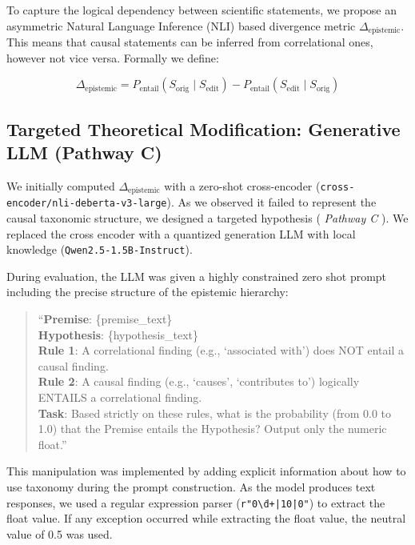 \documentclass[acmsmall]{acmart}
\begin{document}
To capture the logical dependency between scientific statements, we propose an asymmetric Natural Language Inference (NLI) based divergence metric $\Delta_{\text{epistemic}}$. This means that causal statements can be inferred from correlational ones, however not vice versa. Formally we define:

\begin{equation}
\Delta_{\text{epistemic}} = P_{\text{entail}}(S_{\text{orig}} \mid S_{\text{edit}}) - P_{\text{entail}}(S_{\text{edit}} \mid S_{\text{orig}})
\end{equation}

\subsection{Targeted Theoretical Modification: Generative LLM (Pathway C)}

We initially computed $\Delta_{\text{epistemic}}$ with a zero-shot cross-encoder (\texttt{cross-encoder/nli-deberta-v3-large}). As we observed it failed to represent the causal taxonomic structure, we designed a targeted hypothesis (\textit{ Pathway C }). We replaced the cross encoder with a quantized generation LLM with local knowledge (\texttt{Qwen2.5-1.5B-Instruct}). 

During evaluation, the LLM was given a highly constrained zero shot prompt including the precise structure of the epistemic hierarchy:

\begin{quote}
``\textbf{Premise}: \{premise\_text\} \\
\textbf{Hypothesis}: \{hypothesis\_text\} \\
\textbf{Rule 1}: A correlational finding (e.g., `associated with') does NOT entail a causal finding. \\
\textbf{Rule 2}: A causal finding (e.g., `causes', `contributes to') logically ENTAILS a correlational finding. \\
\textbf{Task}: Based strictly on these rules, what is the probability (from 0.0 to 1.0) that the Premise entails the Hypothesis? Output only the numeric float.''
\end{quote}

This manipulation was implemented by adding explicit information about how to use taxonomy during the prompt construction. As the model produces text responses, we used a regular expression parser (\texttt{r"0\.\textbackslash d+|1\.0|0"}) to extract the float value. If any exception occurred while extracting the float value, the neutral value of 0.5 was used.
\end{document}
